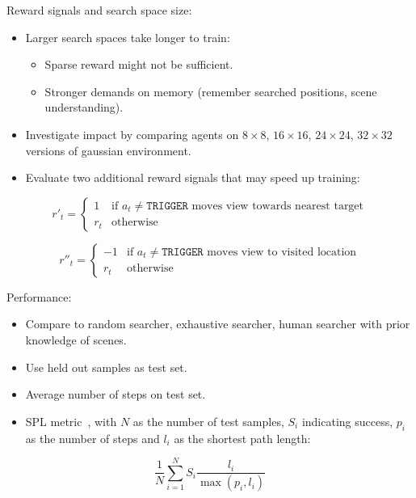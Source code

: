 \begin{frame}

    Reward signals and search space size:

    \begin{itemize}
        \item Larger search spaces take longer to train:
        \begin{itemize}
            \item Sparse reward might not be sufficient.
            \item Stronger demands on memory (remember searched positions, scene understanding).
        \end{itemize}
        \item Investigate impact by comparing agents on \(8 \times 8\), \(16 \times 16\), \(24 \times 24\), \(32 \times 32\) versions of gaussian environment.
        \item Evaluate two additional reward signals that may speed up training:
    \end{itemize}

    \[
        r'_t = 
        \begin{cases}
            1 & \text{if \(a_t \neq \texttt{TRIGGER}\) moves view towards nearest target} \\
            r_t & \text{otherwise}
        \end{cases}
    \]

    \[
        r''_t =
        \begin{cases}
            -1 & \text{if \(a_t \neq \texttt{TRIGGER}\) moves view to visited location} \\
            r_t & \text{otherwise}
        \end{cases}
    \]

\end{frame}

\begin{frame}
    Performance:

    \begin{itemize}
        \item Compare to random searcher, exhaustive searcher, human searcher with prior knowledge of scenes.
        \item Use held out samples as test set.
        \item Average number of steps on test set.
        \item SPL metric~\cite{anderson_evaluation_2018}, with \(N\) as the number of test samples, \(S_i\) indicating success, \(p_i\) as the number of steps and \(l_i\) as the shortest path length:
    \end{itemize}
    \[
        \frac{1}{N} \sum_{i=1}^N S_i \frac{l_i}{\max(p_i,l_i)}
    \]
\end{frame}

